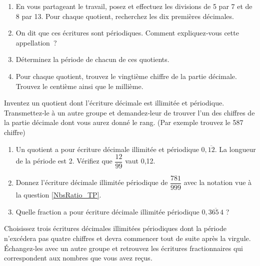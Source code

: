 
\begin{TP}

\begin{enumerate}
 \item En vous partageant le travail, posez et effectuez les divisions de 5 par 7 et de 8 par 13. Pour chaque quotient, recherchez les dix premières décimales.
 \item On dit que ces écritures sont périodiques. Comment expliquez‑vous cette appellation ?
 \item Déterminez la période de chacun de ces quotients.
 \item Pour chaque quotient, trouvez le vingtième chiffre de la partie décimale. Trouvez le centième ainsi que le millième.
 \end{enumerate}

Inventez un quotient dont l'écriture décimale est illimitée et périodique. Transmettez‑le à un autre groupe et demandez‑leur de trouver l'un des chiffres de la partie décimale dont vous aurez donné le rang. (Par exemple trouvez le 587 chiffre)


\begin{enumerate}
 \item Un quotient a pour écriture décimale illimitée et périodique $0,\overline{12}$. La longueur de la période est 2. Vérifiez que $\dfrac{12}{99}$ vaut 0,12. \label{NbsRatio_TP}
 \item Donnez l'écriture décimale illimitée périodique de $\dfrac{781}{999}$ avec la notation vue à la question \ref{NbsRatio_TP}.
 \item Quelle fraction a pour écriture décimale illimitée périodique $0,\overline{365\,4}$ ?
 \end{enumerate}

Choisissez trois écritures décimales illimitées périodiques dont la période n'excédera pas quatre chiffres et devra commencer tout de suite après la virgule. \\[0.5em]
Échangez‑les avec un autre groupe et retrouvez les écritures fractionnaires qui correspondent aux nombres que vous avez reçus.

\end{TP}


